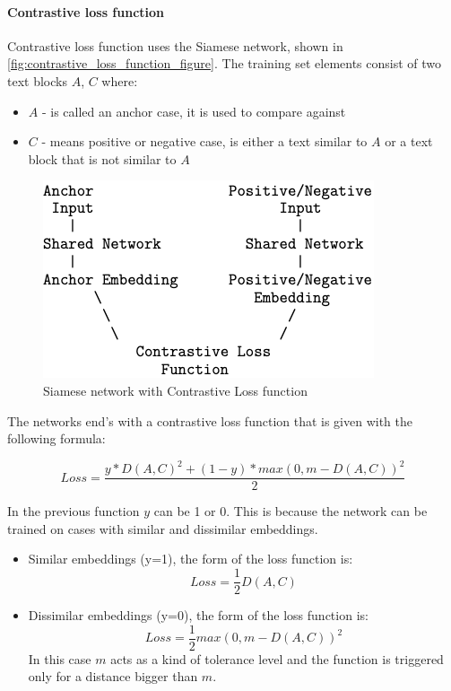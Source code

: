\documentclass{wseas}
\begin{document}
\paragraph{Contrastive loss function}

Contrastive loss function uses the Siamese network, shown in \autoref{fig:contrastive_loss_function_figure}. 
The training set elements consist of two text blocks \(A\), \(C\) where:

\begin{itemize}

\item
  \(A\) - is called an anchor case, it is used to compare against
\item
  \(C\) - means positive or negative case, is either a text similar to
  \(A\) or a text block that is not similar to \(A\)
\end{itemize}

\begin{figure}[htbp]
  \centering
  \includegraphics[width=\linewidth]{resources/v1/contrastiveLoss.png}
  \caption{Siamese network with Contrastive Loss function}
  \label{fig:contrastive_loss_function_figure}
\end{figure}

The networks end's with a contrastive loss function that is given with
the following formula:

\begin{equation} 
  \textstyle  Loss =  \frac{y * D(A,C)^2 + (1-y)*max(0,m-D(A,C))^2}{2} 
\end{equation}

In the previous function \(y\) can be 1 or 0. This is because the
network can be trained on cases with similar and dissimilar embeddings.

\begin{itemize}
\item
  Similar embeddings (y=1), the form of the loss function is: 
  \begin{equation}
    Loss = \frac{1}{2}D(A,C)
  \end{equation}
\item
  Dissimilar embeddings (y=0), the form of the loss function is: 
  \begin{equation}
    Loss =  \frac{1}{2}max(0,m-D(A,C))^2
  \end{equation}
  In this case \(m\) acts as a kind of tolerance level and the
  function is triggered only for a distance bigger than \(m\).
\end{itemize}
\end{document}
